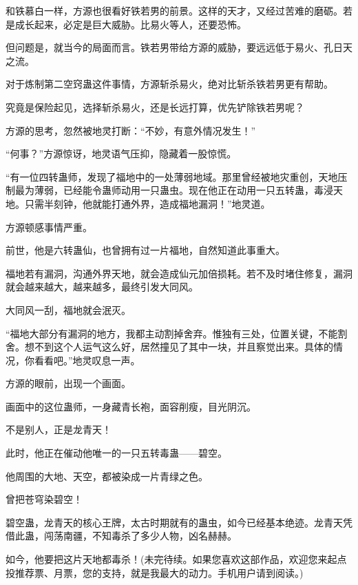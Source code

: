 \begin{this_body}
和铁慕白一样，方源也很看好铁若男的前景。这样的天才，又经过苦难的磨砺。若是成长起来，必定是巨大威胁。比易火等人，还要恐怖。

但问题是，就当今的局面而言。铁若男带给方源的威胁，要远远低于易火、孔日天之流。

对于炼制第二空窍蛊这件事情，方源斩杀易火，绝对比斩杀铁若男更有帮助。

究竟是保险起见，选择斩杀易火，还是长远打算，优先铲除铁若男呢？

方源的思考，忽然被地灵打断：“不妙，有意外情况发生！”

“何事？”方源惊讶，地灵语气压抑，隐藏着一股惊慌。

“有一位四转蛊师，发现了福地中的一处薄弱地域。那里曾经被地灾重创，天地压制最为薄弱，已经能令蛊师动用一只蛊虫。现在他正在动用一只五转蛊，毒浸天地。只需半刻钟，他就能打通外界，造成福地漏洞！”地灵道。

方源顿感事情严重。

前世，他是六转蛊仙，也曾拥有过一片福地，自然知道此事重大。

福地若有漏洞，沟通外界天地，就会造成仙元加倍损耗。若不及时堵住修复，漏洞就会越来越大，越来越多，最终引发大同风。

大同风一刮，福地就会泯灭。

“福地大部分有漏洞的地方，我都主动割掉舍弃。惟独有三处，位置关键，不能割舍。想不到这个人运气这么好，居然撞见了其中一块，并且察觉出来。具体的情况，你看看吧。”地灵叹息一声。

方源的眼前，出现一个画面。

画面中的这位蛊师，一身藏青长袍，面容削瘦，目光阴沉。

不是别人，正是龙青天！

此时，他正在催动他唯一的一只五转毒蛊——碧空。

他周围的大地、天空，都被染成一片青绿之色。

曾把苍穹染碧空！

碧空蛊，龙青天的核心王牌，太古时期就有的蛊虫，如今已经基本绝迹。龙青天凭借此蛊，闯荡南疆，不知毒杀了多少人物，凶名赫赫。

如今，他要把这片天地都毒杀！(未完待续。如果您喜欢这部作品，欢迎您来起点投推荐票、月票，您的支持，就是我最大的动力。手机用户请到阅读。)

\end{this_body}

